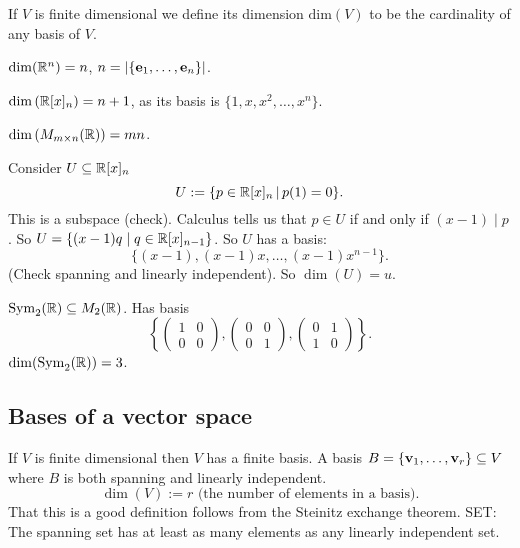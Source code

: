 \documentclass[10pt, a4paper]{article}
\begin{document}
\begin{definition}
    If $V$ is finite dimensional we define its dimension $\mathrm{dim}(V)$ to be the cardinality of any basis of $V$.
\end{definition}

\begin{example}
    $\dim(\mathbb{R} ^ n) = n$,
    $n = \left|\{\mathbf{e}_1, \dotsc, \mathbf{e}_n\}\right|$.

    $\dim{(\mathbb{R}[x]_n)} = n + 1$,
    as its basis is $\{1, x, x ^ 2, \dotsc, x ^ n\}$.

    $\dim{(M_{m \times n}(\mathbb{R}))} = mn$.

    Consider $U \subseteq \mathbb{R}[x]_n$
    \[
    U := \{p \in \mathbb{R}[x]_n\,|\,p(1) = 0\}.
    \]
    This is a subspace
    (check).
    Calculus tells us that $p \in U$ if and only if $(x - 1) \mid p$.
    So $U = \{(x - 1)q\mid q \in \mathbb{R}[x]_{n - 1}\}$.
    So $U$ has a basis:
    \[
    \{(x - 1), (x - 1)x, \dotsc, (x - 1)x ^ {n - 1}\}.
    \]
    (Check spanning and linearly independent).
    So $\dim(U) = u$.

    $\mathrm{Sym}_2(\mathbb{R}) \subseteq M_2(\mathbb{R})$.
    Has basis
    \[
    \left\{\begin{pmatrix}
        1 & 0 \\ 0 & 0
    \end{pmatrix}, \begin{pmatrix}
        0 & 0 \\ 0 & 1
    \end{pmatrix}, \begin{pmatrix}
        0 & 1 \\ 1 & 0
    \end{pmatrix}\right\}.
    \]
    $\dim(\mathrm{Sym}_2(\mathbb{R})) = 3$.
\end{example}

\subsection{Bases of a vector space}
If $V$ is finite dimensional then $V$ has a finite basis.
A basis $B = \{\mathbf{v}_1, \dotsc, \mathbf{v}_r\} \subseteq V$ where $B$ is both spanning and linearly independent.
\[
\dim(V) := r\text{ (the number of elements in a basis)}.
\]
That this is a good definition follows from the Steinitz exchange theorem.
SET:
The spanning set has at least as many elements as any linearly independent set.
\end{document}
